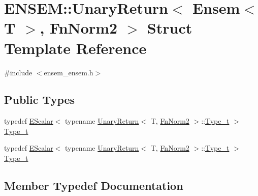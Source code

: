 \hypertarget{structENSEM_1_1UnaryReturn_3_01Ensem_3_01T_01_4_00_01FnNorm2_01_4}{}\section{E\+N\+S\+EM\+:\+:Unary\+Return$<$ Ensem$<$ T $>$, Fn\+Norm2 $>$ Struct Template Reference}
\label{structENSEM_1_1UnaryReturn_3_01Ensem_3_01T_01_4_00_01FnNorm2_01_4}


{\ttfamily \#include $<$ensem\+\_\+ensem.\+h$>$}

\subsection*{Public Types}
\begin{DoxyCompactItemize}
\item 
typedef \mbox{\hyperlink{classENSEM_1_1EScalar}{E\+Scalar}}$<$ typename \mbox{\hyperlink{structENSEM_1_1UnaryReturn}{Unary\+Return}}$<$ T, \mbox{\hyperlink{structENSEM_1_1FnNorm2}{Fn\+Norm2}} $>$\+::\mbox{\hyperlink{structENSEM_1_1UnaryReturn_3_01Ensem_3_01T_01_4_00_01FnNorm2_01_4_ab4124c6816741e910b729ef32c1a9c37}{Type\+\_\+t}} $>$ \mbox{\hyperlink{structENSEM_1_1UnaryReturn_3_01Ensem_3_01T_01_4_00_01FnNorm2_01_4_ab4124c6816741e910b729ef32c1a9c37}{Type\+\_\+t}}
\item 
typedef \mbox{\hyperlink{classENSEM_1_1EScalar}{E\+Scalar}}$<$ typename \mbox{\hyperlink{structENSEM_1_1UnaryReturn}{Unary\+Return}}$<$ T, \mbox{\hyperlink{structENSEM_1_1FnNorm2}{Fn\+Norm2}} $>$\+::\mbox{\hyperlink{structENSEM_1_1UnaryReturn_3_01Ensem_3_01T_01_4_00_01FnNorm2_01_4_ab4124c6816741e910b729ef32c1a9c37}{Type\+\_\+t}} $>$ \mbox{\hyperlink{structENSEM_1_1UnaryReturn_3_01Ensem_3_01T_01_4_00_01FnNorm2_01_4_ab4124c6816741e910b729ef32c1a9c37}{Type\+\_\+t}}
\end{DoxyCompactItemize}


\subsection{Member Typedef Documentation}
\mbox{\label{structENSEM_1_1UnaryReturn_3_01Ensem_3_01T_01_4_00_01FnNorm2_01_4_ab4124c6816741e910b729ef32c1a9c37}} 
